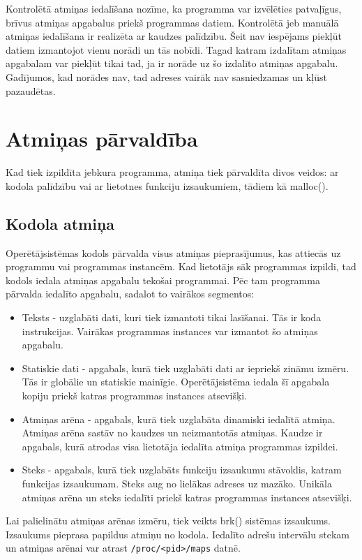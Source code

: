  Kontrolētā atmiņas iedalīšana nozīme, ka programma var izvēlēties patvaļīgus, brīvus atmiņas apgabalus priekš programmas datiem. 
Kontrolētā jeb manuālā atmiņas iedalīšana ir realizēta ar kaudzes palīdzību. 
Šeit nav iespējams piekļūt datiem izmantojot vienu norādi un tās nobīdi. 
Tagad katram izdalītam atmiņas apgabalam var piekļūt tikai tad, ja ir norāde uz šo izdalīto atmiņas apgabalu. 
Gadījumos, kad norādes nav, tad adreses vairāk nav sasniedzamas un kļūst pazaudētas.


\section{Atmiņas pārvaldība}
Kad tiek izpildīta jebkura programma, atmiņa tiek pārvaldīta divos veidos: ar kodola palīdzību vai ar lietotnes funkciju izsaukumiem, tādiem kā malloc().

\subsection{Kodola atmiņa}
Operētājsistēmas kodols pārvalda  visus atmiņas pieprasījumus, kas attiecās uz programmu vai programmas instancēm.
Kad lietotājs sāk programmas izpildi, tad kodols iedala atmiņas apgabalu tekošai programmai.
Pēc tam programma pārvalda iedalīto apgabalu, sadalot to vairākos segmentos: 
\begin{itemize}
	\item   Teksts - uzglabāti dati, kuri tiek izmantoti tikai lasīšanai. Tās ir koda instrukcijas. 
    Vairākas programmas instances var izmantot šo atmiņas apgabalu.
    \item Statiskie dati - apgabals, kurā tiek uzglabāti dati ar iepriekš zināmu izmēru. Tās ir globālie un statiskie mainīgie.
    Operētājsistēma iedala šī apgabala kopiju priekš katras programmas instances atsevišķi.
    \item Atmiņas arēna - apgabals, kurā tiek uzglabāta dinamiski iedalītā atmiņa. Atmiņas arēna sastāv no kaudzes un neizmantotās atmiņas.
    Kaudze ir apgabals, kurā atrodas visa lietotāja iedalīta atmiņa programmas izpildei.
    \item Steks - apgabals, kurā tiek uzglabāts funkciju izsaukumu stāvoklis, katram funkcijas izsaukumam. Steks aug no lielākas adreses uz mazāko. 
    Unikāla atmiņas arēna un steks iedalīti priekš katras programmas instances atsevišķi.
\end{itemize} 
 Lai palielinātu atmiņas arēnas izmēru, tiek veikts brk() sistēmas izsaukums. Izsaukums pieprasa papildus atmiņu no kodola.
 Iedalīto adrešu intervālu stekam un atmiņas arēnai var atrast \texttt{/proc/<pid>/maps} datnē.
